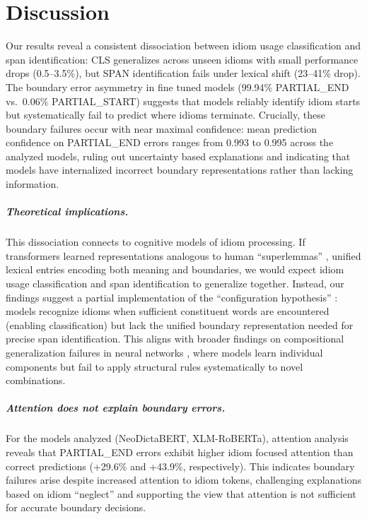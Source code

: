 \documentclass[11pt, a4paper]{report}
\begin{document}

\chapter{Discussion}

Our results reveal a consistent dissociation between idiom usage classification and span identification: CLS generalizes across unseen idioms with small performance drops (0.5--3.5\%), but SPAN identification fails under lexical shift (23--41\% drop). The boundary error asymmetry in fine tuned models (99.94\% PARTIAL\_END vs.\ 0.06\% PARTIAL\_START) suggests that models reliably identify idiom starts but systematically fail to predict where idioms terminate. Crucially, these boundary failures occur with near maximal confidence: mean prediction confidence on PARTIAL\_END errors ranges from 0.993 to 0.995 across the analyzed models, ruling out uncertainty based explanations and indicating that models have internalized incorrect boundary representations rather than lacking information.

\paragraph{Theoretical implications.}
This dissociation connects to cognitive models of idiom processing. If transformers learned representations analogous to human ``superlemmas'' \citep{sprenger2006lexical}, unified lexical entries encoding both meaning and boundaries, we would expect idiom usage classification and span identification to generalize together. Instead, our findings suggest a partial implementation of the ``configuration hypothesis'' \citep{cacciari1988comprehension}: models recognize idioms when sufficient constituent words are encountered (enabling classification) but lack the unified boundary representation needed for precise span identification. This aligns with broader findings on compositional generalization failures in neural networks \citep{lake2018generalization,kim2020cogs}, where models learn individual components but fail to apply structural rules systematically to novel combinations.

\paragraph{Attention does not explain boundary errors.}
For the models analyzed (NeoDictaBERT, XLM-RoBERTa), attention analysis reveals that PARTIAL\_END errors exhibit higher idiom focused attention than correct predictions (+29.6\% and +43.9\%, respectively). This indicates boundary failures arise despite increased attention to idiom tokens, challenging explanations based on idiom ``neglect'' and supporting the view that attention is not sufficient for accurate boundary decisions.
\end{document}
